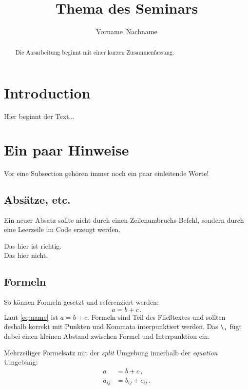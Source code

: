 \documentclass[a4paper]{IEEEtran}
\title{Thema des Seminars}
\author{Vorname~Nachname}
\begin{document}
\maketitle

\begin{abstract}
Die Ausarbeitung beginnt mit einer kurzen Zusammenfassung.
\end{abstract}

\section{Introduction}

Hier beginnt der Text...

\section{Ein paar Hinweise}

Vor eine Subsection gehören immer noch ein paar einleitende Worte!

\subsection{Absätze, etc.}

Ein neuer Absatz sollte nicht durch einen Zeilenumbruchs-Befehl, sondern durch eine Leerzeile im Code erzeugt werden.

Das hier ist richtig.
\\ Das hier nicht.

\subsection{Formeln}

So können Formeln gesetzt und referenziert werden:
\begin{equation}
    a = b + c \,.
    \label{eq:name}
\end{equation}
Laut \eqref{eq:name} ist $a=b+c$. Formeln sind Teil des Fließtextes und sollten deshalb korrekt mit Punkten und Kommata interpunktiert werden.  Das \texttt{\textbackslash,} fügt dabei einen kleinen Abstand zwischen Formel und Interpunktion ein.

Mehrzeiliger Formelsatz mit der \emph{split} Umgebung innerhalb der \emph{equation} Umgebung:
\begin{equation}
    \begin{split}
        a      &= b + c \,, \\
        a_{ij} &= b_{ij} + c_{ij} \,.
    \end{split}
\end{equation}
\end{document}

